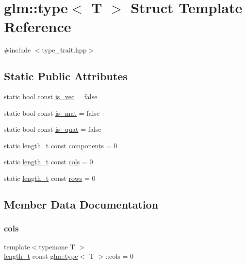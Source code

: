 \hypertarget{structglm_1_1type}{}\section{glm\+:\+:type$<$ T $>$ Struct Template Reference}
\label{structglm_1_1type}


{\ttfamily \#include $<$type\+\_\+trait.\+hpp$>$}

\subsection*{Static Public Attributes}
\begin{DoxyCompactItemize}
\item 
static bool const \mbox{\hyperlink{structglm_1_1type_a236fedee521c9783b686e86c0e1405e0}{is\+\_\+vec}} = false
\item 
static bool const \mbox{\hyperlink{structglm_1_1type_a21702de90bcb0212e4856a22d947bfa3}{is\+\_\+mat}} = false
\item 
static bool const \mbox{\hyperlink{structglm_1_1type_ac0e332a405282f738486bc2134881df8}{is\+\_\+quat}} = false
\item 
static \mbox{\hyperlink{namespaceglm_a090a0de2260835bee80e71a702492ed9}{length\+\_\+t}} const \mbox{\hyperlink{structglm_1_1type_a678f2d75a5ec89fcaceb0934a52800b7}{components}} = 0
\item 
static \mbox{\hyperlink{namespaceglm_a090a0de2260835bee80e71a702492ed9}{length\+\_\+t}} const \mbox{\hyperlink{structglm_1_1type_aa1006a5c502504cd22582b088e675774}{cols}} = 0
\item 
static \mbox{\hyperlink{namespaceglm_a090a0de2260835bee80e71a702492ed9}{length\+\_\+t}} const \mbox{\hyperlink{structglm_1_1type_ad04a64a448a28061ed81f90f0f52b691}{rows}} = 0
\end{DoxyCompactItemize}


\subsection{Member Data Documentation}
\mbox{\label{structglm_1_1type_aa1006a5c502504cd22582b088e675774}} 
\subsubsection{\texorpdfstring{cols}{cols}}
{\footnotesize\ttfamily template$<$typename T $>$ \\
\mbox{\hyperlink{namespaceglm_a090a0de2260835bee80e71a702492ed9}{length\+\_\+t}} const \mbox{\hyperlink{structglm_1_1type}{glm\+::type}}$<$ T $>$\+::cols = 0\hspace{0.3cm}{\ttfamily [static]}}

